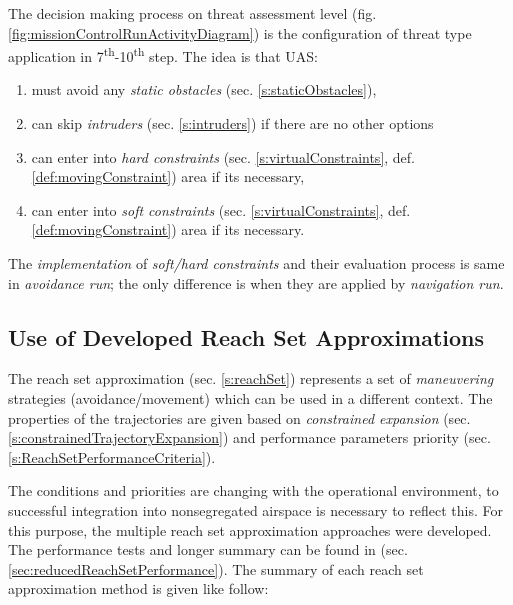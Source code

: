 \newpage

The decision making process on threat assessment level (fig. \ref{fig:missionControlRunActivityDiagram}) is the configuration of threat type application in 7\textsuperscript{th}-10\textsuperscript{th} step. The idea is that UAS:
\begin{enumerate}
    \item must avoid any \emph{static obstacles} (sec. \ref{s:staticObstacles}),
    
    \item can skip \emph{intruders} (sec. \ref{s:intruders}) if there are no other options
    
    \item can enter into \emph{hard constraints} (sec. \ref{s:virtualConstraints}, def. \ref{def:movingConstraint}) area if its necessary,
    
    \item can enter into \emph{soft constraints} (sec. \ref{s:virtualConstraints}, def. \ref{def:movingConstraint}) area if its necessary.
\end{enumerate}

\begin{note}
    The \emph{implementation} of \emph{soft/hard constraints} and their evaluation process is same in \emph{avoidance run}; the only difference is when they are applied by \emph{navigation run}.
\end{note}
    
\subsection{Use of Developed Reach Set Approximations}\label{s:conclusionReachSet}

\noindent The reach set approximation (sec. \ref{s:reachSet}) represents a set of  \emph{maneuvering} strategies (avoidance/movement) which can be used in a different context. The properties of the trajectories are given based on \emph{constrained expansion} (sec. \ref{s:constrainedTrajectoryExpansion}) and performance parameters priority (sec. \ref{s:ReachSetPerformanceCriteria}).

The conditions and priorities are changing with the operational environment, to successful integration into nonsegregated airspace is necessary to reflect this.  For this purpose, the multiple reach set approximation approaches were developed. The performance tests and longer summary can be found in (sec. \ref{sec:reducedReachSetPerformance}). The summary of each reach set approximation method is given like follow:

